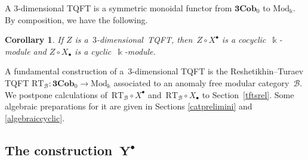 \documentclass[10pt,a4paper]{amsart}
\numberwithin{equation}{section}
\newtheorem{Corollary}[Theorem]{Corollary}
\newcommand{\co}{\colon}
\newcommand{\mc}{\mathcal}
\newcommand{\Mod}{\mathrm{Mod}}
\newcommand{\Cob}{\textbf{Cob}}
\newcommand{\kk}{\Bbbk}
\newcommand{\RT}{\text{RT}}
\begin{document}
A $3$-dimensional TQFT is a symmetric monoidal functor from $\textbf{3}\Cob_0$ to $\Mod_\kk$. By composition, we have the following.

\begin{Corollary} If $Z$ is a~$3$-dimensional~{TQFT}, then~$Z\circ X^\bullet$ is a cocyclic~$\kk$-module and $Z\circ X_\bullet$ is a cyclic~$\kk$-module.
\end{Corollary}
A fundamental construction of a~$3$-dimensional TQFT is the Reshetikhin--Turaev TQFT $\RT_{\mc B} \co \textbf{3}\Cob_0 \to \Mod_\kk$ associated to an anomaly free modular category~$\mc B$.
We postpone calculations of~$\RT_{\mc B}\circ X^\bullet$ and~$\RT_{\mc B}\circ X_\bullet$ to Section~\ref{tftsrel}.
Some algebraic preparations for it are given in Sections \ref{catprelimini} and \ref{algebraiccyclic}.

\subsection[The construction Y\^{}\{bullet\}]{The construction~$\boldsymbol{Y^\bullet}$}\label{construction}
\end{document}
